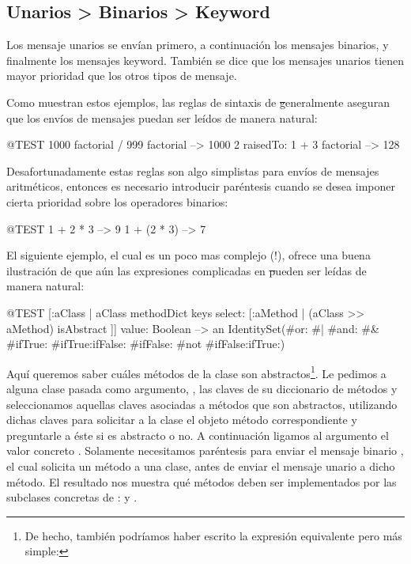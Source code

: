 \documentclass[a4paper,10pt,twoside]{book}
\begin{document}
\subsection*{Unarios > Binarios > Keyword}
Los mensaje unarios se env\'ian primero, a continuaci\'on los mensajes binarios, y finalmente los mensajes keyword. Tambi\'en se dice que los mensajes unarios tienen mayor prioridad que los otros tipos de mensaje.


Como muestran estos ejemplos, las reglas de sintaxis de \st generalmente aseguran que los env\'ios de mensajes puedan ser le\'idos de manera natural:
\begin{code}{@TEST}
1000 factorial / 999 factorial --> 1000
2 raisedTo: 1 + 3 factorial     --> 128
\end{code}
\noindent

Desafortunadamente estas reglas son algo simplistas para env\'ios de mensajes aritm\'eticos, entonces es necesario introducir par\'entesis cuando se desea imponer cierta prioridad sobre los operadores binarios:
\begin{code}{@TEST}
1 + 2 * 3   --> 9
1 + (2 * 3) --> 7
\end{code}

El siguiente ejemplo, el cual es un poco mas complejo (!), ofrece una buena ilustraci\'on de que a\'un las expresiones complicadas en \st pueden ser le\'idas de manera natural:
\begin{code}{@TEST}
[:aClass | aClass methodDict keys select: [:aMethod | (aClass >> aMethod) isAbstract ]] value: Boolean --> an IdentitySet(#or: #| #and: #& #ifTrue: #ifTrue:ifFalse: #ifFalse: #not #ifFalse:ifTrue:)
\end{code}
\noindent
Aqu\'i queremos saber cu\'ales m\'etodos de la clase  son abstractos\footnote{De hecho, tambi\'en podr\'iamos haber escrito la expresi\'on equivalente pero m\'as simple: }.
Le pedimos a alguna clase pasada como argumento, , las claves de su diccionario de m\'etodos y seleccionamos aquellas claves asociadas a m\'etodos que son abstractos, utilizando dichas claves para solicitar a la clase el objeto m\'etodo correspondiente y preguntarle a \'este si es abstracto o no.
A continuaci\'on ligamos al argumento  el valor concreto .
Solamente necesitamos par\'entesis para enviar el mensaje binario \ct{>>}, el cual solicita un m\'etodo a una clase, antes de enviar el mensaje unario \mbox{} a dicho m\'etodo. El resultado nos muestra qu\'e m\'etodos deben ser implementados por las subclases concretas de :  y .
\end{document}

